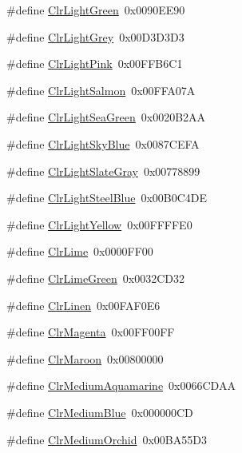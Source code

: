 \begin{DoxyCompactItemize}
\#define \hyperlink{group__primitives__api_ga5a234243f714d812ac234075fcf41529}{Clr\+Light\+Green}~0x0090\+E\+E90
\item 
\#define \hyperlink{group__primitives__api_gae84aa7579d49f63b6c97e7d279af8c4b}{Clr\+Light\+Grey}~0x00\+D3\+D3\+D3
\item 
\#define \hyperlink{group__primitives__api_ga8660fa72c0532d1f4f7791772822f4bf}{Clr\+Light\+Pink}~0x00\+F\+F\+B6\+C1
\item 
\#define \hyperlink{group__primitives__api_gaf88e5c4163621649f5783ee5a6530ed4}{Clr\+Light\+Salmon}~0x00\+F\+F\+A07\+A
\item 
\#define \hyperlink{group__primitives__api_gaa170b1044679357a162c68a8e45354d9}{Clr\+Light\+Sea\+Green}~0x0020\+B2\+A\+A
\item 
\#define \hyperlink{group__primitives__api_gabc87928400d88f1bede97cbeb931cd0a}{Clr\+Light\+Sky\+Blue}~0x0087\+C\+E\+F\+A
\item 
\#define \hyperlink{group__primitives__api_gae637e80ea8cbb601c4ee0dc07b39c42a}{Clr\+Light\+Slate\+Gray}~0x00778899
\item 
\#define \hyperlink{group__primitives__api_gae4ddffc919aef1ee808333bf9e8be740}{Clr\+Light\+Steel\+Blue}~0x00\+B0\+C4\+D\+E
\item 
\#define \hyperlink{group__primitives__api_ga2628ac7420a5bdf9eb5966d3bca1a40c}{Clr\+Light\+Yellow}~0x00\+F\+F\+F\+F\+E0
\item 
\#define \hyperlink{group__primitives__api_gaf6ac664296c1326253df0e0d3c8d2e53}{Clr\+Lime}~0x0000\+F\+F00
\item 
\#define \hyperlink{group__primitives__api_gaa3b70ae4879c96e04362ff2cb7eddefb}{Clr\+Lime\+Green}~0x0032\+C\+D32
\item 
\#define \hyperlink{group__primitives__api_ga2903ae55b7a26663d49ae1c8b58993c8}{Clr\+Linen}~0x00\+F\+A\+F0\+E6
\item 
\#define \hyperlink{group__primitives__api_ga3d98da12caa1d6e90fe3a9a2ddbc9669}{Clr\+Magenta}~0x00\+F\+F00\+F\+F
\item 
\#define \hyperlink{group__primitives__api_ga35712199c79d39124d007f1021b45029}{Clr\+Maroon}~0x00800000
\item 
\#define \hyperlink{group__primitives__api_gaa7ad7ef5471f189e41e28bbcbaad0625}{Clr\+Medium\+Aquamarine}~0x0066\+C\+D\+A\+A
\item 
\#define \hyperlink{group__primitives__api_ga9a69f3524393a52da1df8ce43041f415}{Clr\+Medium\+Blue}~0x000000\+C\+D
\item 
\#define \hyperlink{group__primitives__api_gaea7a5b491192066914b9b1c16c0440c1}{Clr\+Medium\+Orchid}~0x00\+B\+A55\+D3

\end{DoxyCompactItemize}
